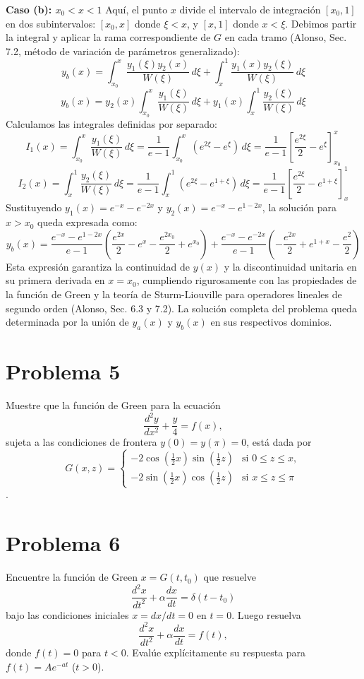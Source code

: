 \documentclass[a4paper]{article}
\begin{document}
\textbf{Caso (b): $x_0 < x < 1$}
Aquí, el punto $x$ divide el intervalo de integración $[x_0, 1]$ en dos subintervalos: $[x_0, x]$ donde $\xi < x$, y $[x, 1]$ donde $x < \xi$. Debimos partir la integral y aplicar la rama correspondiente de $G$ en cada tramo (Alonso, Sec. 7.2, método de variación de parámetros generalizado):
$$ y_b(x) = \int_{x_0}^x \frac{y_1(\xi) y_2(x)}{W(\xi)} \, d\xi + \int_x^1 \frac{y_1(x) y_2(\xi)}{W(\xi)} \, d\xi $$
$$ y_b(x) = y_2(x) \int_{x_0}^x \frac{y_1(\xi)}{W(\xi)} \, d\xi + y_1(x) \int_x^1 \frac{y_2(\xi)}{W(\xi)} \, d\xi $$
Calculamos las integrales definidas por separado:
$$ I_1(x) = \int_{x_0}^x \frac{y_1(\xi)}{W(\xi)} \, d\xi = \frac{1}{e-1} \int_{x_0}^x (e^{2\xi} - e^{\xi}) \, d\xi = \frac{1}{e-1} \left[ \frac{e^{2\xi}}{2} - e^{\xi} \right]_{x_0}^x $$
$$ I_2(x) = \int_x^1 \frac{y_2(\xi)}{W(\xi)} \, d\xi = \frac{1}{e-1} \int_x^1 (e^{2\xi} - e^{1+\xi}) \, d\xi = \frac{1}{e-1} \left[ \frac{e^{2\xi}}{2} - e^{1+\xi} \right]_{x}^1 $$
Sustituyendo $y_1(x) = e^{-x} - e^{-2x}$ y $y_2(x) = e^{-x} - e^{1-2x}$, la solución para $x > x_0$ queda expresada como:
$$ y_b(x) = \frac{e^{-x} - e^{1-2x}}{e-1} \left( \frac{e^{2x}}{2} - e^x - \frac{e^{2x_0}}{2} + e^{x_0} \right) + \frac{e^{-x} - e^{-2x}}{e-1} \left( -\frac{e^{2x}}{2} + e^{1+x} - \frac{e^2}{2} \right) $$
Esta expresión garantiza la continuidad de $y(x)$ y la discontinuidad unitaria en su primera derivada en $x=x_0$, cumpliendo rigurosamente con las propiedades de la función de Green y la teoría de Sturm-Liouville para operadores lineales de segundo orden (Alonso, Sec. 6.3 y 7.2). La solución completa del problema queda determinada por la unión de $y_a(x)$ y $y_b(x)$ en sus respectivos dominios.


\section{Problema 5}
Muestre que la función de Green para la ecuación
$$ \frac{d^2y}{dx^2} + \frac{y}{4} = f(x), $$
sujeta a las condiciones de frontera $y(0) = y(\pi) = 0$, está dada por
$$ G(x, z) = \begin{cases} -2 \cos \left( \frac{1}{2} x \right) \sin \left( \frac{1}{2} z \right) & \text{si } 0 \le z \le x, \\ -2 \sin \left( \frac{1}{2} x \right) \cos \left( \frac{1}{2} z \right) & \text{si } x \le z \le \pi \end{cases} $$.

\section{Problema 6}
Encuentre la función de Green $x = G(t, t_0)$ que resuelve
$$ \frac{d^2x}{dt^2} + \alpha \frac{dx}{dt} = \delta(t - t_0) $$
bajo las condiciones iniciales $x = dx/dt = 0$ en $t = 0$. Luego resuelva
$$ \frac{d^2x}{dt^2} + \alpha \frac{dx}{dt} = f(t), $$
donde $f(t) = 0$ para $t < 0$. Evalúe explícitamente su respuesta para $f(t) = Ae^{-at}$ ($t > 0$).
\end{document}
